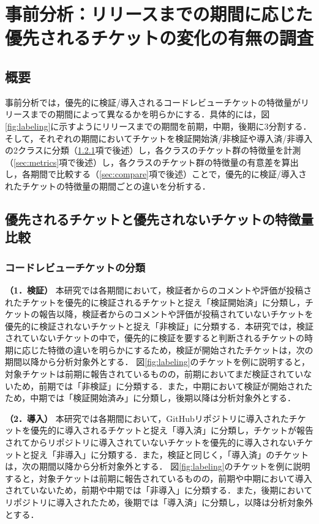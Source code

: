 \documentclass[11pt]{jreport}
\begin{document}
\chapter{事前分析：リリースまでの期間に応じた優先されるチケットの変化の有無の調査}\label{sec:pre_analysis}

\section{概要}
事前分析では，優先的に検証/導入されるコードレビューチケットの特徴量がリリースまでの期間によって異なるかを明らかにする．具体的には，図\ref{fig:labeling}に示すようにリリースまでの期間を前期，中期，後期に3分割する．そして，それぞれの期間においてチケットを検証開始済/非検証や導入済/非導入の2クラスに分類（\ref{sec:bunrui}項で後述）し，各クラスのチケット群の特徴量を計測（\ref{sec:metrics}項で後述）し，各クラスのチケット群の特徴量の有意差を算出し，各期間で比較する（\ref{sec:compare}項で後述）ことで，優先的に検証/導入されたチケットの特徴量の期間ごとの違いを分析する．

\section{優先されるチケットと優先されないチケットの特徴量比較}
\subsection{コードレビューチケットの分類}\label{sec:bunrui}
\textbf{（1．検証）} 本研究では各期間において，検証者からのコメントや評価が投稿されたチケットを優先的に検証されるチケットと捉え「検証開始済」に分類し，チケットの報告以降，検証者からのコメントや評価が投稿されていないチケットを優先的に検証されないチケットと捉え「非検証」に分類する．本研究では，検証されていないチケットの中で，優先的に検証を要すると判断されるチケットの時期に応じた特徴の違いを明らかにするため，検証が開始されたチケットは，次の期間以降から分析対象外とする．
図\ref{fig:labeling}のチケットを例に説明すると，対象チケットは前期に報告されているものの，前期においてまだ検証されていないため，前期では「非検証」に分類する．また，中期において検証が開始されたため，中期では「検証開始済み」に分類し，後期以降は分析対象外とする．

\textbf{（2．導入）} 本研究では各期間において，GitHubリポジトリに導入されたチケットを優先的に導入されるチケットと捉え「導入済」に分類し，チケットが報告されてからリポジトリに導入されていないチケットを優先的に導入されないチケットと捉え「非導入」に分類する．また，検証と同じく，「導入済」のチケットは，次の期間以降から分析対象外とする．
図\ref{fig:labeling}のチケットを例に説明すると，対象チケットは前期に報告されているものの，前期や中期において導入されていないため，前期や中期では「非導入」に分類する．また，後期においてリポジトリに導入されたため，後期では「導入済」に分類し，以降は分析対象外とする．
\end{document}
